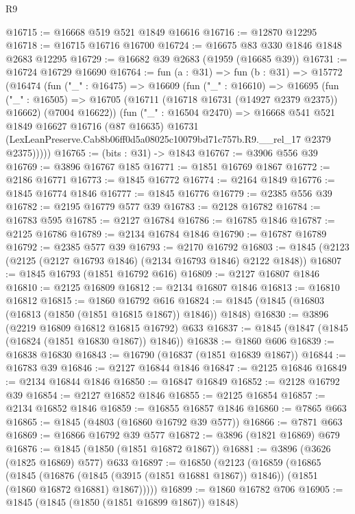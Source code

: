 \begin{lexlean}{R9}
\begin{coremodule}
@16715 := @16668 @519 @521 @1849 @16616
@16716 := @12870 @12295
@16718 := @16715 @16716 @16700
@16724 := @16675 @83 @330 @1846 @1848 @2683 @12295
@16729 := @16682 @39 @2683 (@1959 (@16685 @39))
@16731 := @16724 @16729 @16690
@16764 := fun (a : @31) =>
  fun (b : @31) =>
  @15772
    (@16474
      (fun ("_" : @16475) =>
      @16609
        (fun ("_" : @16610) =>
        @16695
          (fun ("_" : @16505) =>
          @16705 (@16711 (@16718 @16731 (@14927 @2379 @2375)) @16662) (@7004 @16622))
          (fun ("_" : @16504 @2470) =>
          @16668
            @541
            @521
            @1849
            @16627
            @16716
            (@87 @16635)
            @16731
            (LexLeanPreserve.Cab8b06ff0d5a08025c10079bd71c757b.R9.__rel_17 @2379 @2375)))))
@16765 := (bits : @31) -> @1843
@16767 := @3906 @556 @39
@16769 := @3896 @16767 @185
@16771 := @1851 @16769 @1867
@16772 := @2186 @16771
@16773 := @1845 @16772
@16774 := @2164 @1849
@16776 := @1845 @16774 @1846
@16777 := @1845 @16776
@16779 := @2385 @556 @39
@16782 := @2195 @16779 @577 @39
@16783 := @2128 @16782
@16784 := @16783 @595
@16785 := @2127 @16784
@16786 := @16785 @1846
@16787 := @2125 @16786
@16789 := @2134 @16784 @1846
@16790 := @16787 @16789
@16792 := @2385 @577 @39
@16793 := @2170 @16792
@16803 := @1845 (@2123 (@2125 (@2127 @16793 @1846) (@2134 @16793 @1846) @2122 @1848))
@16807 := @1845 @16793 (@1851 @16792 @616)
@16809 := @2127 @16807 @1846
@16810 := @2125 @16809
@16812 := @2134 @16807 @1846
@16813 := @16810 @16812
@16815 := @1860 @16792 @616
@16824 := @1845 (@1845 (@16803 (@16813 (@1850 (@1851 @16815 @1867)) @1846)) @1848)
@16830 := @3896 (@2219 @16809 @16812 @16815 @16792) @633
@16837 := @1845 (@1847 (@1845 (@16824 (@1851 @16830 @1867)) @1846))
@16838 := @1860 @606
@16839 := @16838 @16830
@16843 := @16790 (@16837 (@1851 @16839 @1867))
@16844 := @16783 @39
@16846 := @2127 @16844 @1846
@16847 := @2125 @16846
@16849 := @2134 @16844 @1846
@16850 := @16847 @16849
@16852 := @2128 @16792 @39
@16854 := @2127 @16852 @1846
@16855 := @2125 @16854
@16857 := @2134 @16852 @1846
@16859 := @16855 @16857 @1846
@16860 := @7865 @663
@16865 := @1845 (@4803 (@16860 @16792 @39 @577))
@16866 := @7871 @663
@16869 := @16866 @16792 @39 @577
@16872 := @3896 (@1821 @16869) @679
@16876 := @1845 (@1850 (@1851 @16872 @1867))
@16881 := @3896 (@3626 (@1825 @16869) @577) @633
@16897 := @16850
    (@2123
      (@16859
        (@16865
          (@1845
            (@16876 (@1845 (@3915 (@1851 @16881 @1867)) @1846))
            (@1851 (@1860 @16872 @16881) @1867)))))
@16899 := @1860 @16782 @706
@16905 := @1845 (@1845 (@1850 (@1851 @16899 @1867)) @1848)

\end{coremodule}
\end{lexlean}
